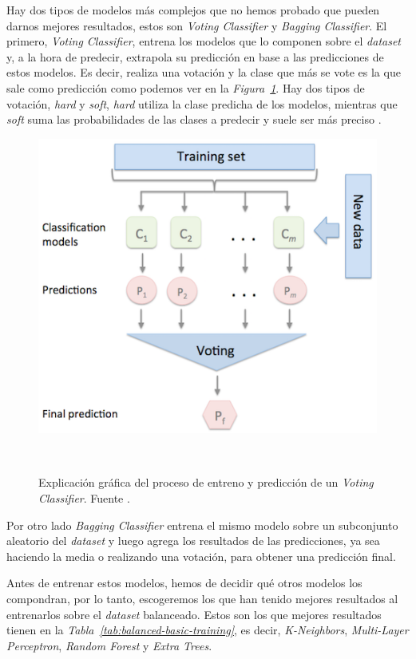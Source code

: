 Hay dos tipos de modelos más complejos que no hemos probado que pueden darnos mejores resultados, estos son \textit{Voting Classifier} y \textit{Bagging Classifier}. El primero, \textit{Voting Classifier}, entrena los modelos que lo componen sobre el \textit{dataset} y, a la hora de predecir, extrapola su predicción en base a las predicciones de estos modelos. Es decir, realiza una votación y la clase que más se vote es la que sale como predicción como podemos ver en la \textit{Figura\ \ref{fig:voting-classifiers}}. Hay dos tipos de votación, \textit{hard} y \textit{soft}, \textit{hard} utiliza la clase predicha de los modelos, mientras que \textit{soft} suma las probabilidades de las clases a predecir y suele ser más preciso \cite{Ensemble96:online}. 

\begin{figure}[!h]
    \centering
    \includegraphics[width=0.7\linewidth]{media/images/majority_voting.png}
    \caption{Explicación gráfica del proceso de entreno y predicción de un \textit{Voting Classifier}. Fuente \cite{Ensemble96:online}.}\ \label{fig:voting-classifiers}
\end{figure}

Por otro lado \textit{Bagging Classifier} entrena el mismo modelo sobre un subconjunto aleatorio del \textit{dataset} y luego agrega los resultados de las predicciones, ya sea haciendo la media o realizando una votación, para obtener una predicción final.\ \cite{sklearne53:online}


Antes de entrenar estos modelos, hemos de decidir qué otros modelos los compondran, por lo tanto, escogeremos los que han tenido mejores resultados al entrenarlos sobre el \textit{dataset} balanceado. Estos son los que mejores resultados tienen en la \textit{Tabla\ \ref{tab:balanced-basic-training}}, es decir, \textit{K-Neighbors}, \textit{Multi-Layer Perceptron}, \textit{Random Forest} y \textit{Extra Trees}.

